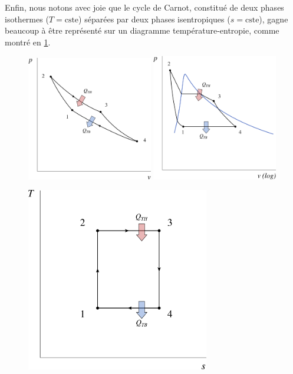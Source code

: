 		\clearfloats
		Enfin, nous notons avec joie que le cycle de Carnot, constitué de deux phases isothermes ($T = \text{cste}$) séparées par deux phases isentropiques ($s = \text{cste}$), gagne beaucoup à être représenté sur un diagramme température-entropie, comme montré en \cref{fig_ts_carnot}.

		\begin{figure}
			\begin{center}
				\includegraphics[width=0.49\textwidth]{images/pv_carnot_gp.png}
				\includegraphics[width=0.49\textwidth]{images/pv_carnot_lv.png}
				\vspace{1cm}
				
				\includegraphics[width=8cm]{images/ts_carnot.png}
			\end{center}
			\label{fig_ts_carnot}
		\end{figure}


